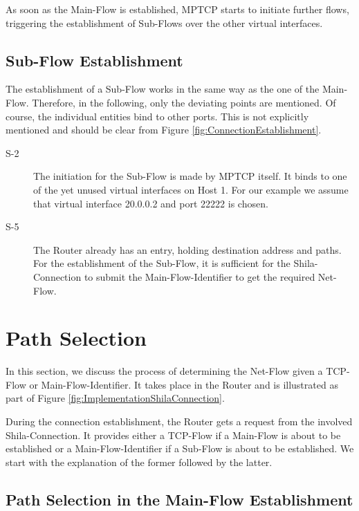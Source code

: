 As soon as the Main-Flow is established, MPTCP starts to initiate further flows, triggering the establishment of Sub-Flows over the other virtual interfaces.

\subsection*{Sub-Flow Establishment}

The establishment of a Sub-Flow works in the same way as the one of the Main-Flow. Therefore, in the following, only the deviating points are mentioned. Of course, the individual entities bind to other ports. This is not explicitly mentioned and should be clear from Figure \ref{fig:ConnectionEstablishment}.

\begin{description}	
\item[S-2] The initiation for the Sub-Flow is made by MPTCP itself. It binds to one of the yet unused virtual interfaces on Host 1. For our example we assume that virtual interface {\footnotesize 20.0.0.2} and port {\footnotesize 22222} is chosen. 
\item[S-5] The Router already has an entry, holding destination address and paths. For the establishment of the Sub-Flow, it is sufficient for the Shila-Connection to submit the Main-Flow-Identifier to get the required Net-Flow.
\end{description}

\newpage
\section{Path Selection}
\label{sec:ImplementationPathSelection}

In this section, we discuss the process of determining the Net-Flow given a TCP-Flow or Main-Flow-Identifier. It takes place in the Router and is illustrated as part of Figure \ref{fig:ImplementationShilaConnection}.

During the connection establishment, the Router gets a request from the involved Shila-Connection. It provides either a TCP-Flow if a Main-Flow is about to be established or a Main-Flow-Identifier if a Sub-Flow is about to be established. We start with the explanation of the former followed by the latter.

\subsection*{Path Selection in the Main-Flow Establishment}

